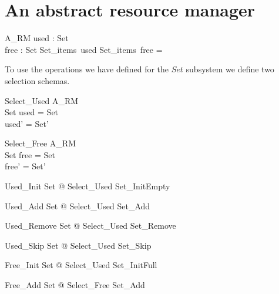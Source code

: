 \documentclass{article}
\begin{document}
\section{An abstract resource manager}

\begin{schema}{A\_RM}
	used : Set \\
	free : Set 
\where
	Set\_items~used \cap Set\_items~free = \emptyset
\end{schema}

To use the operations we have defined for the $Set$ subsystem we define
two selection schemas.

\begin{schema}{Select\_Used}
	\Delta A\_RM \\
	\Delta Set 
\where
	used = \theta Set \\
	used' = \theta Set' \\
\end{schema}

\begin{schema}{Select\_Free}
	\Delta A\_RM \\
	\Delta Set 
\where
	free = \theta Set \\
	free' = \theta Set'
\end{schema}
	

\begin{zed}
	Used\_Init  \exists \Delta Set @ Select\_Used \land Set\_InitEmpty
\end{zed}

\begin{zed}
	Used\_Add  \exists \Delta Set @ Select\_Used \land Set\_Add
\end{zed}

\begin{zed}
	Used\_Remove  \exists \Delta Set @ Select\_Used \land Set\_Remove
\end{zed}

\begin{zed}
	Used\_Skip  \exists \Delta Set @ Select\_Used \land Set\_Skip
\end{zed}

\begin{zed}
	Free\_Init  \exists \Delta Set @ Select\_Used \land Set\_InitFull
\end{zed}

\begin{zed}
	Free\_Add  \exists \Delta Set @ Select\_Free \land Set\_Add
\end{zed}
\end{document}
